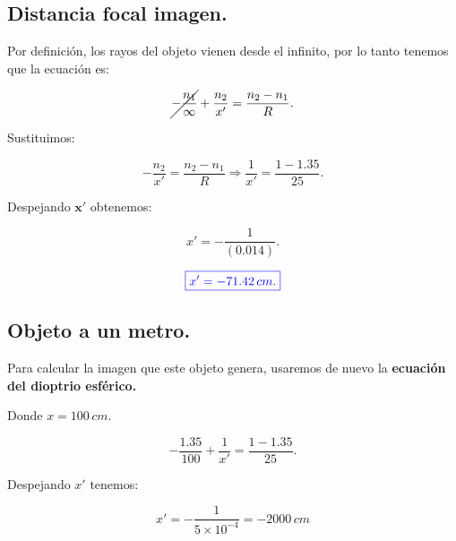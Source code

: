 \documentclass[a4paper,12pt]{article} %
\begin{document}
\vspace{\baselineskip}

\subsection{Distancia focal imagen.}

\begin{justify}
	Por definición, los rayos del objeto vienen desde el infinito, por lo tanto tenemos que la ecuación es:
\end{justify}


\[ \cancel{-\frac{n_1}{\infty}} + \frac{n_2}{x'} = \frac{n_2 - n_1}{R}. \]

\begin{justify}
	Sustituimos:
\end{justify}

\[ -\frac{n_2}{x'} = \frac{n_2 - n_1}{R} \Rightarrow \frac{1}{x'} = \frac{1 - 1.35}{25}. \]

\begin{justify}
	Despejando \(\mathbf{x'}\) obtenemos:
\end{justify}

\[ x' = -\frac{1}{\left(0.014\right)}. \]

\vspace{\baselineskip}

\[\textcolor{blue}{\boxed{x' = -71.42 \, cm.}}\]

\vspace{\baselineskip}

\subsection{Objeto a un metro.}

\begin{justify}
	Para calcular la imagen que este objeto genera, usaremos de nuevo la \textbf{ecuación del dioptrio esférico.}
\end{justify}

\begin{justify}
	Donde \( x = 100 \, cm\).
\end{justify}

\[  -\frac{1.35}{100} + \frac{1}{x'} = \frac{1 - 1.35}{25}. \]

\begin{justify}
	Despejando \(x'\) tenemos:
\end{justify}

\[ x' = - \frac{1}{5 \times 10^{-4}} = -2000 \, cm \]
\end{document}
